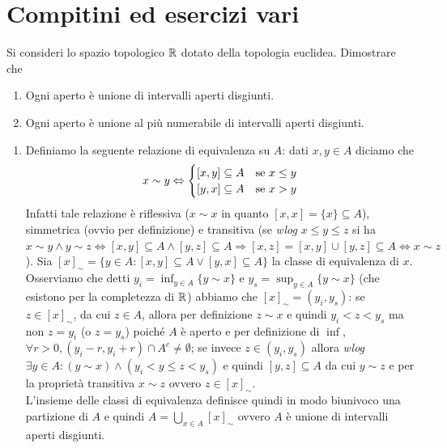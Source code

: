 \documentclass[a4paper]{article}\par \usepackage{style}\par
\begin{document}
\section{Compitini ed esercizi vari}
\begin{vares}
  Si consideri lo spazio topologico $ \R $ dotato della topologia euclidea. Dimostrare che
  \begin{enumerate}[label = (\roman*)]
  \item Ogni aperto è unione di intervalli aperti disgiunti.
  \item Ogni aperto è unione al più numerabile di intervalli aperti disgiunti.
  \end{enumerate}
\end{vares}\par \begin{enumerate}[label = (\roman*)]
\item Definiamo la seguente relazione di equivalenza su $ A $: dati $ x, y \in A $ diciamo che
  \begin{equation*}
    x \sim y \iff
    \begin{cases}
      [x, y] \subseteq A & \text{se $ x \leq y $} \\
      [y, x] \subseteq A & \text{se $ x > y $}
    \end{cases}
  \end{equation*}
  Infatti tale relazione è riflessiva ($ x \sim x $ in quanto $ [x, x] = \{x\} \subseteq A $), simmetrica (ovvio per definizione) e transitiva (se \emph{wlog} $ x \leq y \leq z $ si ha $ x \sim y \wedge y \sim z \iff [x, y] \subseteq A \wedge [y, z] \subseteq A \Rightarrow [x, z] = [x, y] \cup [y, z] \subseteq A \iff x \sim z $). Sia $ [x]_{\sim} = \{y \in A : [x, y] \subseteq A \vee [y, x] \subseteq A\} $ la classe di equivalenza di $ x $. Osserviamo che detti $ y_i = \inf_{y \in A}{\{ y \sim x\}} $ e $ y_s = \sup_{y \in A}{\{y \sim x\}} $ (che esistono per la completezza di $ \R $) abbiamo che $ [x]_{\sim} = (y_i, y_s) $: se $ z \in [x]_{\sim} $, da cui $ z \in A $, allora per definizione $ z \sim x $ e quindi $ y_i  < z < y_s $ ma non $ z = y_i $ (o $ z = y_s $) poiché $ A $ è aperto e per definizione di  $ \inf $, $ \forall r > 0, (y_i - r, y_i + r) \cap A^c \neq \emptyset $; se invece $ z \in (y_i, y_s) $ allora \emph{wlog} $ \exists y \in A :( y \sim x) \wedge (y_i < y \leq z < y_s) $ e quindi $ [y, z] \subseteq A $ da cui $ y \sim z $ e per la proprietà transitiva $ x \sim z $ ovvero $ z \in [x]_{\sim} $.\\
  L'insieme delle classi di equivalenza definisce quindi in modo biunivoco una partizione di $ A $ e quindi $ A = \bigcup_{x \in A} [x]_{\sim} $ ovvero $ A $ è unione di intervalli aperti disgiunti.

\end{enumerate}
\end{document}
